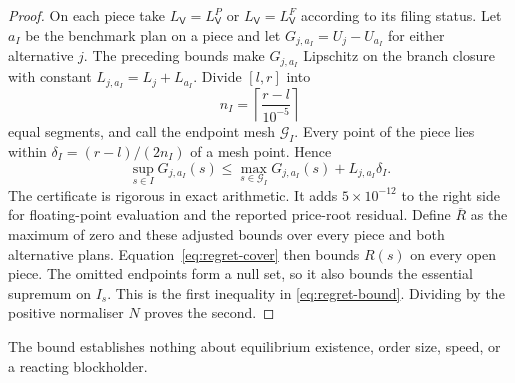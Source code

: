 \begin{proof}
On each piece take $L_{\mathsf{V}}=L_{\mathsf{V}}^P$ or
$L_{\mathsf{V}}=L_{\mathsf{V}}^F$ according to its filing status.
Let $a_I$ be the benchmark plan on a piece and let
$G_{j,a_I}=U_j-U_{a_I}$ for either alternative $j$. The preceding bounds make
$G_{j,a_I}$ Lipschitz on the branch closure with constant
$L_{j,a_I}=L_j+L_{a_I}$. Divide $[l,r]$ into
\[
n_I=\left\lceil\frac{r-l}{10^{-5}}\right\rceil
\]
equal segments, and call the endpoint mesh $\mathcal G_I$. Every point of the piece lies within
$\delta_I=(r-l)/(2n_I)$ of a mesh point. Hence
\begin{equation}
\label{eq:regret-cover}
\sup_{s\in I}G_{j,a_I}(s)
\le \max_{s\in\mathcal G_I}G_{j,a_I}(s)+L_{j,a_I}\delta_I.
\end{equation}
The certificate is rigorous in exact arithmetic. It adds $5\times10^{-12}$ to the right side for
floating-point evaluation and the reported price-root residual. Define $\overline R$ as the maximum
of zero and these adjusted bounds over every piece and
both alternative plans. Equation~\eqref{eq:regret-cover} then bounds $R(s)$ on every open piece.
The omitted endpoints form a null set, so it also bounds the essential supremum on $I_s$. This is
the first inequality in \eqref{eq:regret-bound}. Dividing by the positive normaliser $N$ proves the
second.
\end{proof}

The bound establishes nothing about equilibrium existence, order size, speed, or a reacting
blockholder.
